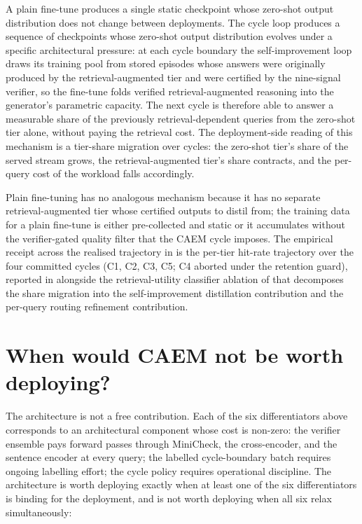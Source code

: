 A plain fine-tune produces a single static checkpoint whose zero-shot output distribution does not change between deployments. The cycle loop produces a sequence of checkpoints whose zero-shot output distribution evolves under a specific architectural pressure: at each cycle boundary the self-improvement loop draws its training pool from stored episodes whose answers were originally produced by the retrieval-augmented tier and were certified by the nine-signal verifier, so the fine-tune folds verified retrieval-augmented reasoning into the generator's parametric capacity. The next cycle is therefore able to answer a measurable share of the previously retrieval-dependent queries from the zero-shot tier alone, without paying the retrieval cost. The deployment-side reading of this mechanism is a tier-share migration over cycles: the zero-shot tier's share of the served stream grows, the retrieval-augmented tier's share contracts, and the per-query cost of the workload falls accordingly.

Plain fine-tuning has no analogous mechanism because it has no separate retrieval-augmented tier whose certified outputs to distil from; the training data for a plain fine-tune is either pre-collected and static or it accumulates without the verifier-gated quality filter that the CAEM cycle imposes. The empirical receipt across the realised trajectory in  is the per-tier hit-rate trajectory over the four committed cycles (C1, C2, C3, C5; C4 aborted under the retention guard), reported in  alongside the retrieval-utility classifier ablation of  that decomposes the share migration into the self-improvement distillation contribution and the per-query routing refinement contribution.


\section[When not to deploy]{When would CAEM not be worth deploying?}
\label{app:qa-when-not}

The architecture is not a free contribution. Each of the six differentiators above corresponds to an architectural component whose cost is non-zero: the verifier ensemble pays forward passes through MiniCheck, the cross-encoder, and the sentence encoder at every query; the labelled cycle-boundary batch requires ongoing labelling effort; the cycle policy requires operational discipline. The architecture is worth deploying exactly when at least one of the six differentiators is binding for the deployment, and is not worth deploying when all six relax simultaneously:

